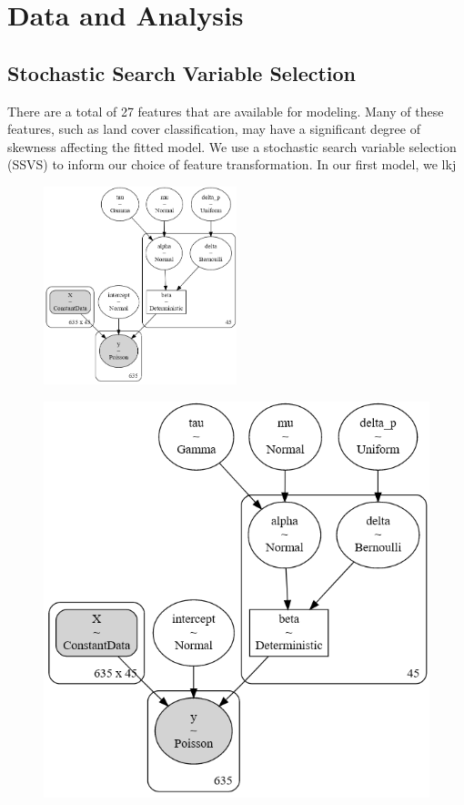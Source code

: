 \documentclass[notitlepage]{article}
\begin{document}
\section{Data and Analysis}

\subsection{Stochastic Search Variable Selection}

There are a total of 27 features that are available for modeling.
Many of these features, such as land cover classification, may have a significant degree of skewness affecting the fitted model.
We use a stochastic search variable selection (SSVS) to inform our choice of feature transformation.
In our first model, we lkj

\begin{figure}[hbt!]
\centering
\includegraphics[width=0.5\textwidth]{report/figures/svss_model.png}
\end{figure}

\begin{figure}[hbt!]
\centering
\includegraphics[width=\textwidth]{report/figures/svss_model.png}
\end{figure}
\end{document}
